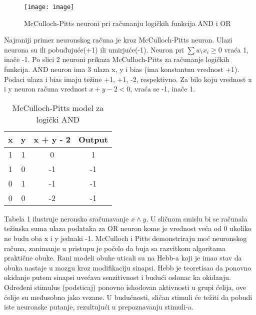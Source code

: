 \documentclass[fontsize=11bp, paper=a4]{scrarticle}
\begin{document}

\begin{figure}[h]
    \centering
    \texttt{[image: image]}
    \caption{McCulloch-Pitts neuroni pri računanju logičkih funkcija AND i OR}
\end{figure}

Najraniji primer neuronskog računa je kroz McCulloch-Pitts neuron. Ulazi neurona su ili pobuđujuće(+1) ili umirjuće(-1). Neuron pri $\sum w_i x_i \ge 0$ vraća 1, inače -1. Po slici 2 neuroni prikaza McCulloch-Pitts za računanje logičkih funkcija. AND neuron ima 3 ulaza x, y i bias (ima konstantnu vrednost +1). Podaci ulaza i bias imaju težine +1, +1, -2, respektivno. Za bilo koju vrednost x i y neuron računa vrednost $x + y - 2 < 0$, vraća se -1, inače 1. 

\begin{table}[h!]
    \centering
    \begin{tabular}{|c|c|c|c|}
    \hline    
    x & y & x + y - 2 & Output \\ \hline
        1& 1 & 0 &  1 \\ \hline
        1& 0 &  -1&  -1 \\ \hline
        0& 1 &  -1&  -1 \\ \hline
        0& 0 & -2 &  -1 \\ \hline
    \end{tabular}
    \caption{ McCulloch-Pitts model za logički AND }
\end{table}

Tabela 1 ilustruje neronsko sračunavanje $x \land y$. U sličnom smislu bi se računala težinska suma ulaza podataka za OR neuron kome je vrednost veća od 0 ukoliko ne budu oba x i y jednaki -1.
McCulloch i Pitts demonstriraju moć neuronskog računa, zanimanje u pristupu je počelo da buja sa razvitkom algoritama praktične obuke. Rani modeli obuke uticali su na Hebb-a koji je imao stav da obuka nastaje u mozgu kroz modifikaciju sinapsi. Hebb je teoretisao da ponovno okidanje putem sinapsi uvećava senzitivnost i budući oslonac ka okidanju. Određeni stimulus (podsticaj) ponovno ishodovan aktivnosti u grupi ćelija, ove ćelije su međusobno jako vezane. U budućnosti, sličan stimuli će težiti da pobudi iste neuronske putanje, rezultujući u prepoznavanju stimuli-a.
\end{document}
